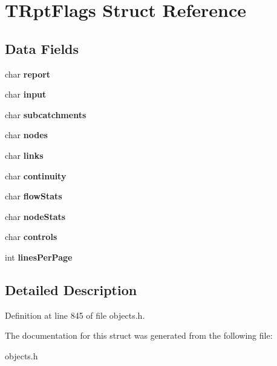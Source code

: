 \hypertarget{struct_t_rpt_flags}{}\section{T\+Rpt\+Flags Struct Reference}
\label{struct_t_rpt_flags}
\subsection*{Data Fields}
\begin{DoxyCompactItemize}
\item 
\mbox{\label{struct_t_rpt_flags_acf626bdb3db39679d51695b6c2df02f0}} 
char {\bfseries report}
\item 
\mbox{\label{struct_t_rpt_flags_a38deedb02dcebac366f97a0879b3be5b}} 
char {\bfseries input}
\item 
\mbox{\label{struct_t_rpt_flags_ae41a2ef98d730691af2ab6f4d096b6fd}} 
char {\bfseries subcatchments}
\item 
\mbox{\label{struct_t_rpt_flags_ab5550fd5b1adfc7bf5e7c38a41f447be}} 
char {\bfseries nodes}
\item 
\mbox{\label{struct_t_rpt_flags_a76172acf1941300203ae2cf852cc6de6}} 
char {\bfseries links}
\item 
\mbox{\label{struct_t_rpt_flags_ab74d2b714781dcfbf89e0804b4c6b9bf}} 
char {\bfseries continuity}
\item 
\mbox{\label{struct_t_rpt_flags_a4db022988d752f9fee38369133099e05}} 
char {\bfseries flow\+Stats}
\item 
\mbox{\label{struct_t_rpt_flags_aa781a7caa71b6d506d52d22cd4c07ada}} 
char {\bfseries node\+Stats}
\item 
\mbox{\label{struct_t_rpt_flags_acd6dccd57364cf7dddab2eb3d27b54c6}} 
char {\bfseries controls}
\item 
\mbox{\label{struct_t_rpt_flags_a4955adc23cf83f1c3b333af37495af65}} 
int {\bfseries lines\+Per\+Page}
\end{DoxyCompactItemize}


\subsection{Detailed Description}


Definition at line 845 of file objects.\+h.



The documentation for this struct was generated from the following file\+:\begin{DoxyCompactItemize}
\item 
objects.\+h\end{DoxyCompactItemize}
